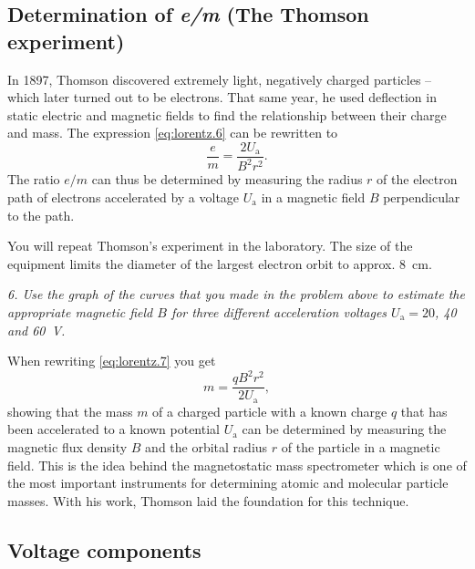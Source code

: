 \documentclass[../Elmag-labhefte-2020.tex]{subfiles}
\begin{document}
\subsection{Determination of \textsl{e/m} (The Thomson experiment)}
 
In 1897, Thomson discovered
extremely light, negatively charged particles -- which later turned out to be electrons. That same year, he used deflection in static electric and magnetic fields to find the relationship between their charge and mass. The expression \eqref{eq:lorentz.6} can be rewritten to
\begin{equation}
    \frac{e}{m} = \frac{2 U_\mathrm{a}} {B^2 r^2}.
    \label{eq:lorentz.7}
\end{equation}
%
The ratio $e/m$ can thus be determined by measuring the radius $r$ of the electron path of electrons accelerated by a voltage $U_{\mathrm{a}}$ in a magnetic field $B$ perpendicular to the path.

You will repeat Thomson's experiment in the laboratory. The size of the equipment limits the diameter of the largest electron orbit to approx. \SI{8}{\cm}.

\emph{ 6. Use the graph of the curves that you made in the problem above to estimate the appropriate magnetic field $B$ for three different acceleration voltages $U_\mathrm{a} = 20$, \num{40} and \SI{60}{\volt}.}
 
When rewriting \eqref{eq:lorentz.7} you get
\begin{equation}
    m = \frac{q B^2 r^2}{2 U_\mathrm{a}},
    \label{eq:lorentz.8}
\end{equation}
%
showing that the mass $m$ of a charged particle with a known charge $q$ that has been accelerated to a known potential $U_\mathrm{a}$ can be determined by measuring the magnetic flux density $B$ and the orbital radius $r$ of the particle in a magnetic field. This is the idea behind the magnetostatic mass spectrometer which is one of the most important instruments for determining atomic and molecular particle masses. With his work, Thomson laid the foundation for this technique.

\subsection{Voltage components \label{lorentz.spenningsdeler}}
 
\end{document}
